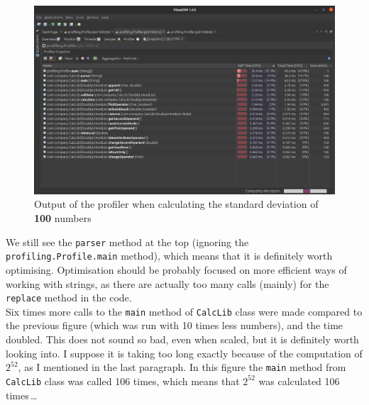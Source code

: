 \documentclass[12pt]{article}
\begin{document}
    \begin{figure}[h]
      \begin{center}
        \includegraphics[width=16cm]{profiling_result-100_numbers.eps}
        \caption{Output of the profiler when calculating the standard deviation of \textbf{100} numbers}
      \end{center}
    \end{figure}

    We still see the \texttt{parser} method at the top (ignoring the 
    \texttt{profiling.Profile.main} method), which means that it is definitely worth
    optimising. Optimisation should be probably focused on more efficient ways 
    of working with strings, as there are actually too many calls (mainly) for 
    the \texttt{replace} method in the code. \\

    Six times more calls to the \texttt{main} method of \texttt{CalcLib} class were
    made compared to the previous figure (which was run with 10 times less 
    numbers), and the time doubled. This does not sound so bad, even when 
    scaled, but it is definitely worth looking into. I suppose
    it is taking too long exactly because of the computation of $2^{52}$, as
    I mentioned in the last paragraph. In this figure the \texttt{main} method from
    \texttt{CalcLib} class was called 106 times, which means that $2^{52}$ was calculated
    106 times\,\dots

    \newpage
\end{document}
